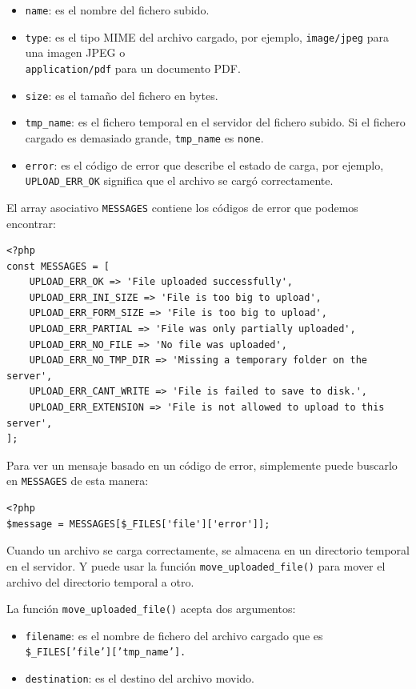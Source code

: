 \documentclass[11pt]{article}
\begin{document}
\begin{itemize}
\item \texttt{name}: es el nombre del fichero subido.
\item \texttt{type}: es el tipo MIME del archivo cargado, por ejemplo,
\texttt{image/jpeg} para una imagen JPEG o \\
\texttt{application/pdf} para un documento PDF.
\item \texttt{size}: es el tamaño del fichero en bytes.
\item \texttt{tmp\_name}: es el fichero temporal en el servidor del fichero
subido. Si el fichero cargado es demasiado grande, \texttt{tmp\_name} es
\texttt{none}.
\item \texttt{error}: es el código de error que describe el estado de carga,
por ejemplo, \texttt{UPLOAD\_ERR\_OK} significa que el archivo se cargó
correctamente.
\end{itemize}

El array asociativo \texttt{MESSAGES} contiene los códigos de error que
podemos encontrar:
\begin{verbatim}
<?php
const MESSAGES = [
    UPLOAD_ERR_OK => 'File uploaded successfully',
    UPLOAD_ERR_INI_SIZE => 'File is too big to upload',
    UPLOAD_ERR_FORM_SIZE => 'File is too big to upload',
    UPLOAD_ERR_PARTIAL => 'File was only partially uploaded',
    UPLOAD_ERR_NO_FILE => 'No file was uploaded',
    UPLOAD_ERR_NO_TMP_DIR => 'Missing a temporary folder on the server',
    UPLOAD_ERR_CANT_WRITE => 'File is failed to save to disk.',
    UPLOAD_ERR_EXTENSION => 'File is not allowed to upload to this server',
];
\end{verbatim}

Para ver un mensaje basado en un código de error, simplemente
puede buscarlo en \texttt{MESSAGES} de esta manera:
\begin{verbatim}
<?php
$message = MESSAGES[$_FILES['file']['error']];
\end{verbatim}

Cuando un archivo se carga correctamente, se almacena en un directorio
temporal en el servidor. Y puede usar la función
\texttt{move\_uploaded\_file()} para mover el archivo del directorio temporal a
otro.

La función \texttt{move\_uploaded\_file()} acepta dos argumentos:

\begin{itemize}
\item \texttt{filename}: es el nombre de fichero del archivo cargado que es
\texttt{\$\_FILES['file']['tmp\_name'].}
\item \texttt{destination}: es el destino del archivo movido.
\end{itemize}
\end{document}
